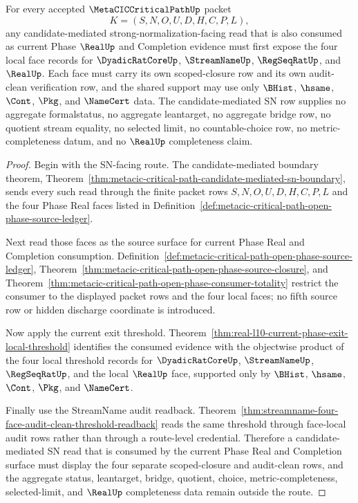 \begin{theorem}
\label{thm:metacic-critical-path-candidate-sn-four-face-audit-precondition}
For every accepted $\MetaCICCriticalPathUp$ packet
$$
K=(S,N,O,U,D,H,C,P,L),
$$
any candidate-mediated strong-normalization-facing read that is also consumed as current Phase $\RealUp$ and Completion evidence must first expose the four local face records for $\DyadicRatCoreUp$, $\StreamNameUp$, $\RegSeqRatUp$, and $\RealUp$. Each face must carry its own scoped-closure row and its own audit-clean verification row, and the shared support may use only $\BHist$, $\hsame$, $\Cont$, $\Pkg$, and $\NameCert$ data. The candidate-mediated SN row supplies no aggregate formalstatus, no aggregate leantarget, no aggregate bridge row, no quotient stream equality, no selected limit, no countable-choice row, no metric-completeness datum, and no $\RealUp$ completeness claim.
\end{theorem}
\begin{proof}
Begin with the SN-facing route. The candidate-mediated boundary theorem, Theorem~\ref{thm:metacic-critical-path-candidate-mediated-sn-boundary}, sends every such read through the finite packet rows $S,N,O,U,D,H,C,P,L$ and the four Phase Real faces listed in Definition~\ref{def:metacic-critical-path-open-phase-source-ledger}.

Next read those faces as the source surface for current Phase Real and Completion consumption. Definition~\ref{def:metacic-critical-path-open-phase-source-ledger}, Theorem~\ref{thm:metacic-critical-path-open-phase-source-closure}, and Theorem~\ref{thm:metacic-critical-path-open-phase-consumer-totality} restrict the consumer to the displayed packet rows and the four local faces; no fifth source row or hidden discharge coordinate is introduced.

Now apply the current exit threshold. Theorem~\ref{thm:real-l10-current-phase-exit-local-threshold} identifies the consumed evidence with the objectwise product of the four local threshold records for $\DyadicRatCoreUp$, $\StreamNameUp$, $\RegSeqRatUp$, and the local $\RealUp$ face, supported only by $\BHist$, $\hsame$, $\Cont$, $\Pkg$, and $\NameCert$.

Finally use the StreamName audit readback. Theorem~\ref{thm:streamname-four-face-audit-clean-threshold-readback} reads the same threshold through face-local audit rows rather than through a route-level credential. Therefore a candidate-mediated SN read that is consumed by the current Phase Real and Completion surface must display the four separate scoped-closure and audit-clean rows, and the aggregate status, leantarget, bridge, quotient, choice, metric-completeness, selected-limit, and $\RealUp$ completeness data remain outside the route.
\end{proof}

